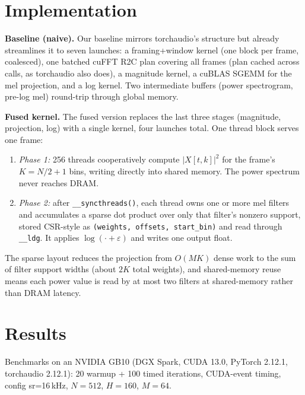 \documentclass[10pt]{article}
\begin{document}
\section{Implementation}

\textbf{Baseline (naive).} Our baseline mirrors torchaudio's structure but
already streamlines it to seven launches: a framing+window kernel (one block
per frame, coalesced), one batched cuFFT R2C plan covering all frames
(plan cached across calls, as torchaudio also does), a magnitude kernel, a
cuBLAS SGEMM for the mel projection, and a log kernel. Two intermediate
buffers (power spectrogram, pre-log mel) round-trip through global memory.

\textbf{Fused kernel.} The fused version replaces the last three stages
(magnitude, projection, log) with a single kernel, four launches total. One
thread block serves one frame:
\begin{enumerate}
  \item \emph{Phase 1:} 256 threads cooperatively compute $|X[t,k]|^2$ for the
        frame's $K = N/2{+}1$ bins, writing directly into shared memory. The
        power spectrum never reaches DRAM.
  \item \emph{Phase 2:} after \texttt{\_\_syncthreads()}, each thread owns one
        or more mel filters and accumulates a sparse dot product over only
        that filter's nonzero support, stored CSR-style as
        \texttt{(weights, offsets, start\_bin)} and read through
        \texttt{\_\_ldg}. It applies $\log(\cdot+\varepsilon)$ and writes one
        output float.
\end{enumerate}
The sparse layout reduces the projection from $O(MK)$ dense work to the sum of
filter support widths (about $2K$ total weights), and shared-memory reuse
means each power value is read by at most two filters at shared-memory rather
than DRAM latency.

\section{Results}

Benchmarks on an NVIDIA GB10 (DGX Spark, CUDA 13.0, PyTorch 2.12.1,
torchaudio 2.12.1): 20 warmup + 100 timed iterations, CUDA-event timing,
config sr=16\,kHz, $N{=}512$, $H{=}160$, $M{=}64$.
\end{document}
